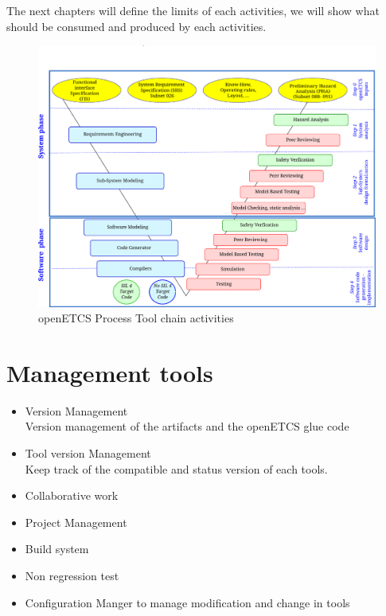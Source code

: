 The next chapters will define the limits of each activities, we will
show what should be consumed and produced by each activities. 
\begin{figure}[htbp]
  \centering
  \includegraphics[width=\textwidth]{images/WholeProcess_Activities}
  \caption{openETCS Process Tool chain activities}
  \label{fig:openETCSActivities}
\end{figure}


\section{Management tools}
\begin{itemize}
\item Version Management\\
Version management of the artifacts and the openETCS glue code 
\item Tool version Management \\
Keep track of the compatible and status version of each tools. 
\item Collaborative work
\item Project  Management
\item Build system
\item Non regression test
\item Configuration Manger to manage modification and change in tools
\end{itemize}



